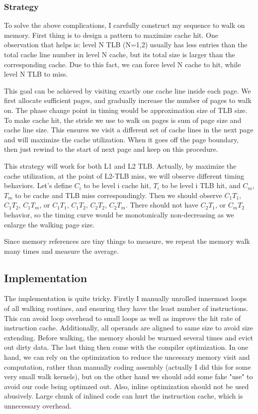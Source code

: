 \subsubsection{Strategy}
To solve the above complications, I carefully construct my sequence to walk on
memory. First thing is to design a pattern to maximize cache hit. One
observation that helps is: level N TLB (N=1,2) usually has less entries than the total
cache line number in level N cache, but its total size is larger than the corresponding
cache. Due to this fact, we can force level N cache to hit, while level N TLB to miss.

This goal can be achieved by visiting exactly one cache line inside each page.
We first allocate sufficient pages, and gradually increase the number of pages
to walk on.  The phase change point in timing would be approximation size of
TLB size. To make cache hit, the stride we use to walk on pages is sum of page
size and cache line size. This ensures we visit a different set of cache lines
in the next page and will maximize the cache utilization. When it goes off the
page boundary, then just rewind to the start of next page and keep on this
procedure. 

This strategy will work for both L1 and L2 TLB. Actually, by maximize the cache
utilization, at the point of L2-TLB miss, we will observe different timing
behaviors. Let's define $C_i$ to be level i cache hit, $T_i$ to be level i
TLB hit, and $C_m$, $T_m$ to be cache and TLB miss correspondingly. Then we
should observe $C_1T_1$, $C_1T_2$, $C_1T_m$, or $C_1T_1$, $C_1T_2$, $C_2T_2$,
$C_2T_m$. There should not have $C_2T_1$, or $C_mT_2$ behavior, so the timing
curve would be monotonically non-decreasing as we enlarge the walking page size.

Since memory references are tiny things to measure, we repeat the memory walk
many times and measure the average.

\subsection{Implementation}
The implementation is quite tricky. Firstly I manually unrolled innermost loops
of all walking routines, and ensuring they have the least number of
instructions. This can avoid loop overhead to small loops as well as improve
the hit rate of instruction cache. Additionally, all operands are aligned to same
size to avoid size extending. Before walking, the memory should be warmed
several times and evict out dirty data. The last thing then come with the
compiler optimization. In one hand, we can rely on the optimization to reduce
the uncessary memory visit and computation, rather than manually coding
assembly (actually I did this for some very small walk kernels), but on the
other hand we should add some fake "use" to avoid our code being optimzed out.
Also, inline optimization should not be used abusively. Large chunk of inlined
code can hurt the instruction cache, which is unnecessary overhead.

